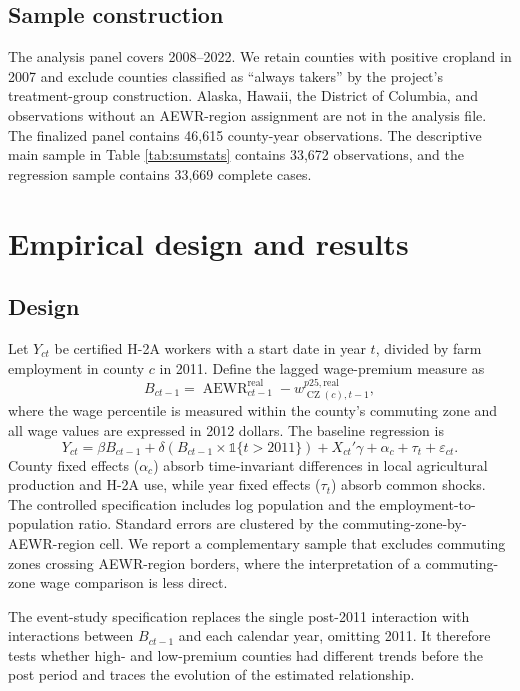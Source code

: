 \documentclass[14pt]{article}
\begin{document}
\subsection{Sample construction}
The analysis panel covers 2008--2022.  We retain counties with positive
cropland in 2007 and exclude counties classified as ``always takers'' by the
project's treatment-group construction.  Alaska, Hawaii, the District of
Columbia, and observations without an AEWR-region assignment are not in the
analysis file.  The finalized panel contains 46,615 county-year observations.
The descriptive main sample in Table \ref{tab:sumstats} contains 33,672
observations, and the regression sample contains 33,669 complete cases.



\section{Empirical design and results}

\subsection{Design}

Let $Y_{ct}$ be certified H-2A workers with a start date in year $t$, divided
by farm employment in county $c$ in 2011.  Define the lagged wage-premium
measure as
\[
B_{ct-1}=\operatorname{AEWR}^{\mathrm{real}}_{ct-1}
 - w^{p25,\mathrm{real}}_{\operatorname{CZ}(c),t-1},
\]
where the wage percentile is measured within the county's commuting zone and
all wage values are expressed in 2012 dollars.  The baseline regression is
\[
Y_{ct}=\beta B_{ct-1}+\delta\left(B_{ct-1}\times
\mathbb{1}\{t>2011\}\right)+X_{ct}'\gamma+\alpha_c+\tau_t+\varepsilon_{ct}.
\]
County fixed effects ($\alpha_c$) absorb time-invariant differences in local
agricultural production and H-2A use, while year fixed effects ($\tau_t$)
absorb common shocks.  The controlled specification includes log population
and the employment-to-population ratio.  Standard errors are clustered by the
commuting-zone-by-AEWR-region cell.  We report a complementary sample that
excludes commuting zones crossing AEWR-region borders, where the interpretation
of a commuting-zone wage comparison is less direct.

The event-study specification replaces the single post-2011 interaction with
interactions between $B_{ct-1}$ and each calendar year, omitting 2011.  It
therefore tests whether high- and low-premium counties had different trends
before the post period and traces the evolution of the estimated relationship.
\end{document}
